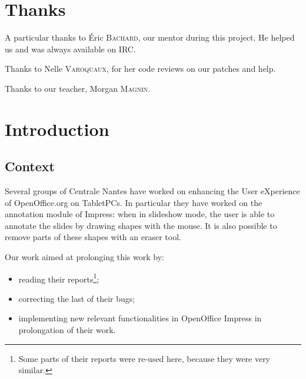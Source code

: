 \documentclass[a4paper,11pt]{article}
\begin{document}
\newpage
\tableofcontents

\newpage

\setcounter{page}{1}
\fancyfoot[C]{\thepage}
\section*{Thanks}
A particular thanks to Éric \textsc{Bachard}, our mentor during this project. He helped us and was always available on IRC.

Thanks to Nelle \textsc{Varoquaux}, for her code reviews on our patches and help.

Thanks to our teacher, Morgan \textsc{Magnin}.

\newpage

\fancyfoot[C]{\thepage}
\section*{Introduction}

\subsection*{Context}

Several groups of Centrale Nantes have worked on enhancing the User eXperience
of OpenOffice.org on TabletPCs. In particular they have worked on the
annotation module of Impress: when in slideshow mode, the user is able to
annotate the slides by drawing shapes with the mouse. It is also possible to
remove parts of these shapes with an eraser tool.

Our work aimed at prolonging this work by:

\begin{itemize}

\item reading their reports\footnote{Some parts of their reports were re-used
here, because they were very similar.};

\item correcting the last of their bugs;

\item implementing new relevant functionalities in OpenOffice Impress in
prolongation of their work.

\end{itemize}
\end{document}

